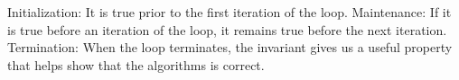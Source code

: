 Initialization: 
  It is true prior to the first iteration of the loop.
Maintenance: 
  If it is true before an iteration of the loop, it remains true before the next iteration.
Termination: 
  When the loop terminates, the invariant gives us a useful property that helps show that the algorithms is correct.

